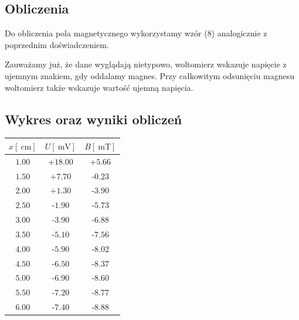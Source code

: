 \documentclass{fizykalab}
\begin{document}
{{{{\subsection*{Obliczenia}
Do obliczenia pola magnetycznego wykorzystamy wzór (8) analogicznie z poprzednim doświadczeniem.

\mbox{}\newline
Zauważamy już, że dane wyglądają nietypowo, woltomierz wskazuje napięcie z ujemnym znakiem, gdy oddalamy magnes. Przy całkowitym odsunięciu magnesu woltomierz także wskazuje wartość ujemną napięcia.

\newpage

\subsection*{Wykres oraz wyniki obliczeń}
\begin{table}[H]
	\centering
	\begin{tabular}{|c|c|c|}
		\hline
		$x [\SI{}{\centi\meter}]$ & $U [\SI{}{\milli\volt}]$ & $B [\SI{}{\milli\tesla}]$ \\ \hline
		$1.00$                    & $+18.00$                 & $+5.66$                   \\ \hline
		$1.50$                    & $+7.70$                  & -$0.23$                   \\ \hline
		$2.00$                    & $+1.30$                  & -$3.90$                   \\ \hline
		$2.50$                    & -$1.90$                  & -$5.73$                   \\ \hline
		$3.00$                    & -$3.90$                  & -$6.88$                   \\ \hline
		$3.50$                    & -$5.10$                  & -$7.56$                   \\ \hline
		$4.00$                    & -$5.90$                  & -$8.02$                   \\ \hline
		$4.50$                    & -$6.50$                  & -$8.37$                   \\ \hline
		$5.00$                    & -$6.90$                  & -$8.60$                   \\ \hline
		$5.50$                    & -$7.20$                  & -$8.77$                   \\ \hline
		$6.00$                    & -$7.40$                  & -$8.88$                   \\ \hline

\end{tabular}
\end{table}}}}}
\end{document}
